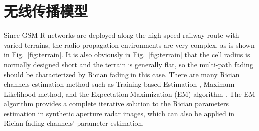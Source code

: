 \section{无线传播模型}
\label{sec:channelmodel}

Since GSM-R networks are deployed along the high-speed railway route with varied terrains, the radio propagation environments are very complex, as is shown in Fig.~\ref{fig:terrain}. It is also obviously in Fig.~\ref{fig:terrain} that the cell radius is normally designed short and the terrain is generally flat, so the multi-path fading should be characterized by Rician fading in this case. There are many Rician channels estimation method such as Training-based Estimation \cite{bjornson2010framework}, Maximum Likelihood \cite{sijbers1998maximum} method, and the Expectation Maximization (EM) algorithm \cite{marzetta1995algorithm}. The EM algorithm provides a complete iterative solution to the Rician parameters estimation in synthetic aperture radar images, which can also be applied in Rician fading channels' parameter estimation.

\begin{figure}[!htp]
\centering
{}
    \hspace{1cm}
\hspace{1in}
\centering
{}
    \hspace{1cm}
\end{figure}

